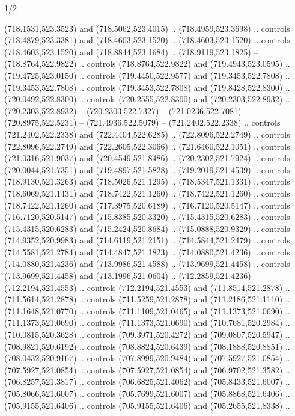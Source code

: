 \begin{flagdescription}{1/2}
\begin{scope}[xshift=0.5\flaglength,yshift=0.5\flagwidth,scale=\flagwidth/759]
\begin{scope}[y=0.8pt, x=0.8pt, yscale=-1,shift={(-720,-480)}]
\begin{scope}[cm={{1.14637,0.0,0.0,1.17117,(33.17849,82.1384)}}]
\begin{scope}[cm={{0.87232,0.0,0.0,0.85385,(-28.9422,-70.1339)}}]
\begin{scope}[draw=cd0c9ce,line width=0.107\lw]
  (718.1531,523.3523) and (718.5062,523.4015) .. (718.4959,523.3698) .. controls
  (718.4879,523.3381) and (718.4603,523.1520) .. (718.4603,523.1520) .. controls
  (718.4603,523.1520) and (718.8844,523.1684) .. (718.9119,523.1825) --
  (718.8764,522.9822) .. controls (718.8764,522.9822) and (719.4943,523.0595) ..
  (719.4725,523.0150) .. controls (719.4450,522.9577) and (719.3453,522.7808) ..
  (719.3453,522.7808) .. controls (719.3453,522.7808) and (719.8428,522.8300) ..
  (720.0492,522.8300) .. controls (720.2555,522.8300) and (720.2303,522.8932) ..
  (720.2303,522.8932) -- (720.2303,522.7327) -- (721.0236,522.7081) --
  (720.8975,522.5231) -- (721.4936,522.5079) -- (721.2402,522.2338) .. controls
  (721.2402,522.2338) and (722.4404,522.6285) .. (722.8096,522.2749) .. controls
  (722.8096,522.2749) and (722.2605,522.3066) .. (721.6460,522.1051) .. controls
  (721.0316,521.9037) and (720.4549,521.8486) .. (720.2302,521.7924) .. controls
  (720.0044,521.7351) and (719.4897,521.5828) .. (719.2019,521.4539) .. controls
  (718.9130,521.3263) and (718.5026,521.1295) .. (718.5347,521.1331) .. controls
  (718.6069,521.1431) and (718.7422,521.1260) .. (718.7422,521.1260) .. controls
  (718.7422,521.1260) and (717.3975,520.6189) .. (716.7120,520.5147) .. controls
  (716.7120,520.5147) and (715.8385,520.3320) .. (715.4315,520.6283) .. controls
  (715.4315,520.6283) and (715.2424,520.8684) .. (715.0888,520.9329) .. controls
  (714.9352,520.9983) and (714.6119,521.2151) .. (714.5844,521.2479) .. controls
  (714.5581,521.2784) and (714.4847,521.1823) .. (714.0880,521.4236) .. controls
  (714.0880,521.4236) and (713.9986,521.4588) .. (713.9699,521.4458) .. controls
  (713.9699,521.4458) and (713.1996,521.0604) .. (712.2859,521.4236) --
  (712.2194,521.4553) .. controls (712.2194,521.4553) and (711.8514,521.2878) ..
  (711.5614,521.2878) .. controls (711.5259,521.2878) and (711.2186,521.1110) ..
  (711.1648,521.0770) .. controls (711.1109,521.0465) and (711.1373,521.0690) ..
  (711.1373,521.0690) .. controls (711.1373,521.0690) and (710.7681,520.2984) ..
  (710.0815,520.3628) .. controls (709.3971,520.4272) and (709.0807,520.5947) ..
  (708.9821,520.6192) .. controls (708.8824,520.6439) and (708.1888,520.8851) ..
  (708.0432,520.9167) .. controls (707.8999,520.9484) and (707.5927,521.0854) ..
  (707.5927,521.0854) .. controls (707.5927,521.0854) and (706.9702,521.3582) ..
  (706.8257,521.3817) .. controls (706.6825,521.4062) and (705.8433,521.6007) ..
  (705.8066,521.6007) .. controls (705.7699,521.6007) and (705.8868,521.6406) ..
  (705.9155,521.6406) .. controls (705.9155,521.6406) and (705.2655,521.8338) ..

\end{scope}
\end{scope}
\end{scope}
\end{scope}
\end{scope}
\end{flagdescription}

